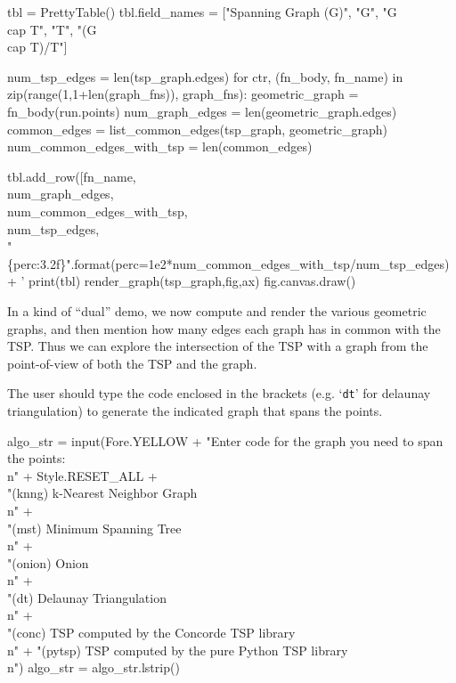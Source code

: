 tbl             = PrettyTable()
tbl.field_names = ["Spanning Graph (G)", "G", "G \\cap T", "T", "(G \\cap T)/T"]

num_tsp_edges = len(tsp_graph.edges)
for ctr, (fn_body, fn_name) in zip(range(1,1+len(graph_fns)), graph_fns):
     geometric_graph = fn_body(run.points)
     num_graph_edges = len(geometric_graph.edges)
     common_edges    = list_common_edges(tsp_graph, geometric_graph)
     num_common_edges_with_tsp = len(common_edges)

     tbl.add_row([fn_name,                   \\
                num_graph_edges,           \\
                num_common_edges_with_tsp, \\
                num_tsp_edges,             \\
                "\{perc:3.2f\}".format(perc=1e2*num_common_edges_with_tsp/num_tsp_edges)+ ' %
print(tbl)
render_graph(tsp_graph,fig,ax)
fig.canvas.draw()
\nwendcode{}\nwdocspar

In a kind of ``dual'' demo, we now compute and render the various geometric graphs, and then mention how many 
edges each graph has in common with the TSP. Thus we can explore the intersection of the TSP with a graph
from the point-of-view of both the TSP and the graph. 

The user should type the code enclosed in the brackets (e.g. `\verb|dt|' for delaunay triangulation) to generate the 
indicated graph that spans the points. 

\nwenddocs{}\endmoddef\nwstartdeflinemarkup{}\nwenddeflinemarkup
algo_str = input(Fore.YELLOW + "Enter code for the graph you need to span the points:\\n" + Style.RESET_ALL  +\\
                     "(knng)   k-Nearest Neighbor Graph        \\n"            +\\
                     "(mst)    Minimum Spanning Tree           \\n"            +\\
                     "(onion)  Onion                           \\n"            +\\
                     "(dt)     Delaunay Triangulation         \\n"             +\\
                     "(conc)   TSP computed by the Concorde TSP library \\n" +
                     "(pytsp)  TSP computed by the pure Python TSP library \\n")
algo_str = algo_str.lstrip()

